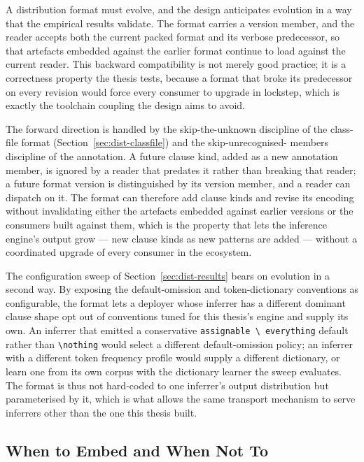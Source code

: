 A distribution format must evolve, and the design anticipates evolution in a way
that the empirical results validate. The format carries a version member, and the
reader accepts both the current packed format and its verbose predecessor, so that
artefacts embedded against the earlier format continue to load against the current
reader. This backward compatibility is not merely good practice; it is a
correctness property the thesis tests, because a format that broke its predecessor
on every revision would force every consumer to upgrade in lockstep, which is
exactly the toolchain coupling the design aims to avoid.

The forward direction is handled by the skip-the-unknown discipline of the
class-file format (Section~\ref{sec:dist-classfile}) and the skip-unrecognised-
members discipline of the annotation. A future clause kind, added as a new
annotation member, is ignored by a reader that predates it rather than breaking
that reader; a future format version is distinguished by its version member, and a
reader can dispatch on it. The format can therefore add clause kinds and revise
its encoding without invalidating either the artefacts embedded against earlier
versions or the consumers built against them, which is the property that lets the
inference engine's output grow --- new clause kinds as new patterns are added ---
without a coordinated upgrade of every consumer in the ecosystem.

The configuration sweep of Section~\ref{sec:dist-results} bears on evolution in a
second way. By exposing the default-omission and token-dictionary conventions as
configurable, the format lets a deployer whose inferrer has a different dominant
clause shape opt out of conventions tuned for this thesis's engine and supply its
own. An inferrer that emitted a conservative \texttt{assignable \textbackslash
everything} default rather than \texttt{\textbackslash nothing} would select a
different default-omission policy; an inferrer with a different token frequency
profile would supply a different dictionary, or learn one from its own corpus with
the dictionary learner the sweep evaluates. The format is thus not hard-coded to
one inferrer's output distribution but parameterised by it, which is what allows
the same transport mechanism to serve inferrers other than the one this thesis
built.

\subsection{When to Embed and When Not To}

